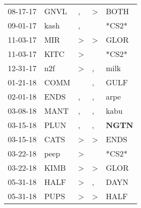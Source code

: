 \begin{supertabular}{p{0.07\textwidth}p{0.06\textwidth}p{0.02\textwidth}p{0.02\textwidth}p{0.06\textwidth}}
          08-17-17\textsuperscript{} &           GNVL\textsuperscript{} &                , &     \textgreater &           BOTH\textsuperscript{} \\
          09-01-17\textsuperscript{} &           kash\textsuperscript{} &                , &                  &                            *CS2* \\
          11-03-17\textsuperscript{} &            MIR\textsuperscript{} &     \textgreater &     \textgreater &           GLOR\textsuperscript{} \\
          11-03-17\textsuperscript{} &           KITC\textsuperscript{} &     \textgreater &                  &                            *CS2* \\
          12-31-17\textsuperscript{} &            n2f\textsuperscript{} &     \textgreater &                , &           milk\textsuperscript{} \\
          01-21-18\textsuperscript{} &           COMM\textsuperscript{} &                  &                , &           GULF\textsuperscript{} \\
          02-01-18\textsuperscript{} &           ENDS\textsuperscript{} &                , &                , &           arpe\textsuperscript{} \\
          03-08-18\textsuperscript{} &           MANT\textsuperscript{} &                , &                , &           kabu\textsuperscript{} \\
          03-15-18\textsuperscript{} &           PLUN\textsuperscript{} &                , &                , &  \textbf{NGTN\textsuperscript{}} \\
          03-15-18\textsuperscript{} &           CATS\textsuperscript{} &     \textgreater &     \textgreater &           ENDS\textsuperscript{} \\
          03-22-18\textsuperscript{} &           peep\textsuperscript{} &     \textgreater &                  &                            *CS2* \\
          03-22-18\textsuperscript{} &           KIMB\textsuperscript{} &     \textgreater &     \textgreater &           GLOR\textsuperscript{} \\
          05-31-18\textsuperscript{} &           HALF\textsuperscript{} &     \textgreater &                , &           DAYN\textsuperscript{} \\
          05-31-18\textsuperscript{} &           PUPS\textsuperscript{} &     \textgreater &     \textgreater &           HALF\textsuperscript{} \\

\end{supertabular}
